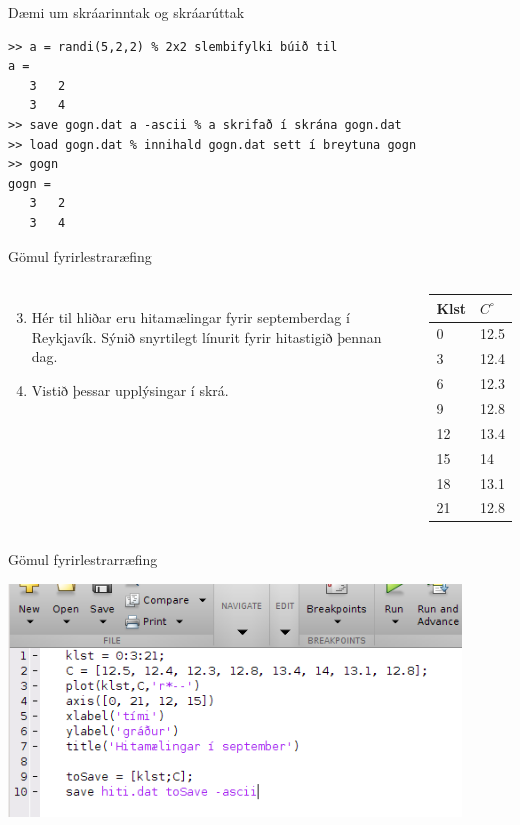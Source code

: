 \documentclass{beamer}
\begin{document}
\begin{frame}[fragile]{Dæmi um skráarinntak og skráarúttak}
\begin{verbatim}
>> a = randi(5,2,2) % 2x2 slembifylki búið til
a =
   3   2
   3   4
>> save gogn.dat a -ascii % a skrifað í skrána gogn.dat
>> load gogn.dat % innihald gogn.dat sett í breytuna gogn
>> gogn
gogn =
   3   2
   3   4
\end{verbatim}
\end{frame}


\begin{frame}{Gömul fyrirlestraræfing}
\begin{columns}
\begin{enumerate}
\setcounter{enumi}{2}
 \item Hér til hliðar eru hitamælingar fyrir septemberdag í Reykjavík. Sýnið snyrtilegt línurit fyrir hitastigið þennan dag.
 \item Vistið þessar upplýsingar í skrá.
\end{enumerate}
\begin{center}
\begin{tabular}{ll}
\toprule
Klst&$C^\circ$\\
\midrule
0&12.5\\
3&12.4\\
6&12.3\\
9&12.8\\
12&13.4\\
15&14\\
18&13.1\\
21&12.8\\
\bottomrule
\end{tabular}
\end{center}
\end{columns}
\end{frame}

\begin{frame}[fragile]{Gömul fyrirlestrarræfing}
\begin{center}
\includegraphics[width=0.9\textwidth]{Pics/septemberhitiscript}
\end{center}
\end{frame}
\end{document}

